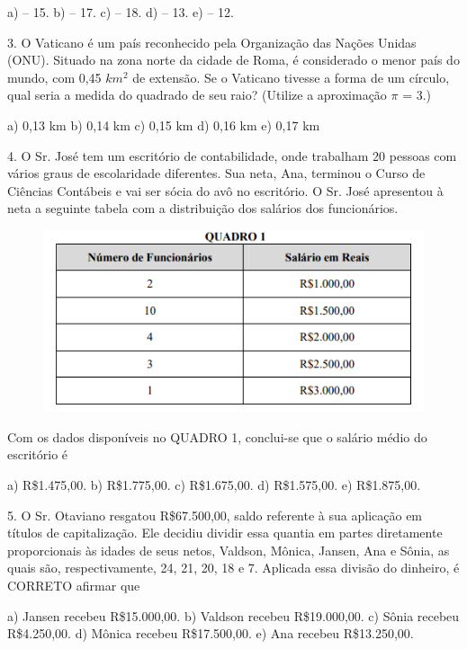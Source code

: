 \documentclass[12pt,a4paper]{article}
\begin{document}
\vspace{2ex}
a) – 15.
b) – 17.
c) – 18.
d) – 13.
e) – 12. 
\vspace{2ex}

3. O Vaticano é um país reconhecido pela Organização das Nações Unidas (ONU). Situado na zona norte
da cidade de Roma, é considerado o menor país do mundo, com 0,45 $km^2$ de extensão. Se o Vaticano tivesse a forma de um círculo, qual seria a medida do quadrado de seu raio? (Utilize a aproximação $\pi$ = 3.) 

\vspace{2ex}
a) 0,13 km
b) 0,14 km
c) 0,15 km
d) 0,16 km
e) 0,17 km 
\vspace{2ex}

4. O Sr. José tem um escritório de contabilidade, onde trabalham 20 pessoas com vários graus de
escolaridade diferentes. Sua neta, Ana, terminou o Curso de Ciências Contábeis e vai ser sócia do avô no
escritório. O Sr. José apresentou à neta a seguinte tabela com a distribuição dos salários dos funcionários. 

\begin{figure}[ht]
\centering
\includegraphics[width=0.6 \linewidth]{./figuras/quadro1.png}
\end{figure}

Com os dados disponíveis no QUADRO 1, conclui-se que o salário médio do escritório é

\vspace{2ex}
a) R\$1.475,00.
b) R\$1.775,00.
c) R\$1.675,00.
d) R\$1.575,00.
e) R\$1.875,00.

\vspace{2ex}

5. O Sr. Otaviano resgatou R\$67.500,00, saldo referente à sua aplicação em títulos de capitalização. Ele
decidiu dividir essa quantia em partes diretamente proporcionais às idades de seus netos, Valdson,
Mônica, Jansen, Ana e Sônia, as quais são, respectivamente, 24, 21, 20, 18 e 7. Aplicada essa divisão
do dinheiro, é CORRETO afirmar que

\vspace{2ex}
a) Jansen recebeu R\$15.000,00.
b) Valdson recebeu R\$19.000,00.
c) Sônia recebeu R\$4.250,00.
d) Mônica recebeu R\$17.500,00.
e) Ana recebeu R\$13.250,00. 
\end{document}
